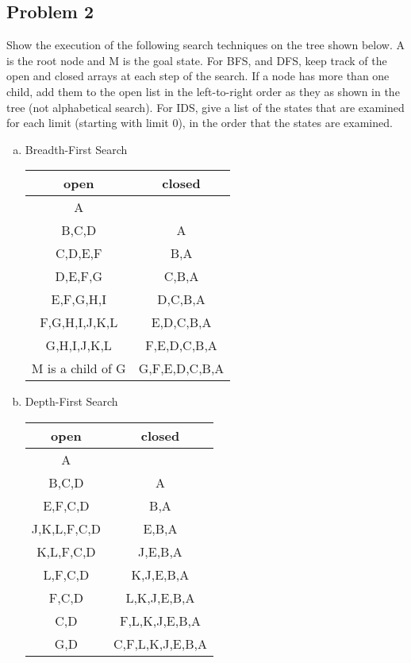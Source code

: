 \documentclass{math}
\begin{document}
\subsection*{Problem 2}
Show the execution of the following search techniques on the tree shown below.
A is the root node and M is the goal state. For BFS, and DFS, keep track of the
open and closed arrays at each step of the search. If a node has more than one
child, add them to the open list in the left-to-right order as they as shown
in the tree (not alphabetical search). For IDS, give a list of the states that
are examined for each limit (starting with limit 0), in the order that the
states are examined.
\begin{enumerate}[(a)]
  \item Breadth-First Search
  \begin{center}
    \begin{tabular}{|c|c|}
      \hline
      open & closed \\ \hline
      A & \\ \hline
      B,C,D & A \\ \hline
      C,D,E,F & B,A \\ \hline
      D,E,F,G & C,B,A \\ \hline
      E,F,G,H,I & D,C,B,A \\ \hline
      F,G,H,I,J,K,L & E,D,C,B,A \\ \hline
      G,H,I,J,K,L & F,E,D,C,B,A \\ \hline
      M is a child of G & G,F,E,D,C,B,A \\ \hline
    \end{tabular}
  \end{center}
  \item Depth-First Search
  \begin{center}
    \begin{tabular}{|c|c|}
      \hline
      open & closed \\ \hline
      A & \\ \hline
      B,C,D & A \\ \hline
      E,F,C,D & B,A \\ \hline
      J,K,L,F,C,D & E,B,A \\ \hline
      K,L,F,C,D & J,E,B,A \\ \hline
      L,F,C,D & K,J,E,B,A \\ \hline
      F,C,D & L,K,J,E,B,A \\ \hline
      C,D & F,L,K,J,E,B,A \\ \hline
      G,D & C,F,L,K,J,E,B,A \\ \hline

\end{tabular}
\end{center}
\end{enumerate}
\end{document}
